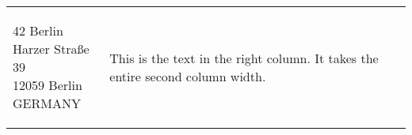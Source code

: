 \documentclass[11pt]{article}
\begin{document}


\fontsize{9}{11}\selectfont

\noindent
\begin{tabularx}{\textwidth}{@{}X X@{}}

\colorbox{yellow!30}{
  \parbox[t]{\dimexpr\linewidth\relax}{
    \hspace*{2.5cm}%
    \begin{minipage}[t]{\dimexpr\linewidth-3cm\relax} %
      42 Berlin\\
      Harzer Straße 39\\
      12059 Berlin\\
      GERMANY
    \end{minipage}
  }
}

&
\begin{minipage}[t]{\linewidth}
\colorbox{blue!20}{
  \parbox[t]{\dimexpr\linewidth-2\fboxsep}{ %
    This is the text in the right column. It takes the entire second column width.
  }
}
\end{minipage}

\end{tabularx}
\end{document}
